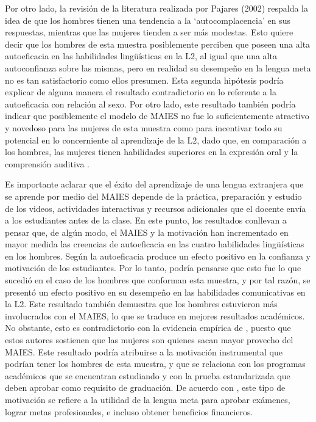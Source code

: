 \documentclass[spanish]{textolivre}
\begin{document}
Por otro lado, la revisión de la literatura realizada por Pajares (2002) respalda la idea de que los hombres tienen una tendencia a la ‘autocomplacencia’ en sus respuestas, mientras que las mujeres tienden a ser más modestas. Esto quiere decir que los hombres de esta muestra posiblemente perciben que poseen una alta autoeficacia en las habilidades lingüísticas en la L2, al igual que una alta autoconfianza sobre las mismas, pero en realidad su desempeño en la lengua meta no es tan satisfactorio como ellos presumen. Esta segunda hipótesis podría explicar de alguna manera el resultado contradictorio en lo referente a la autoeficacia con relación al sexo. Por otro lado, este resultado también podría indicar que posiblemente el modelo de MAIES no fue lo suficientemente atractivo y novedoso para las mujeres de esta muestra como para incentivar todo su potencial en lo concerniente al aprendizaje de la L2, dado que, en comparación a los hombres, las mujeres tienen habilidades superiores en la expresión oral y la comprensión auditiva \cite{abdelhafez_efl_2016,zhu_relationship_2020}.

Es importante aclarar que el éxito del aprendizaje de una lengua extranjera que se aprende por medio del MAIES depende de la práctica, preparación y estudio de los videos, actividades interactivas y recursos adicionales que el docente envía a los estudiantes antes de la clase. En este punto, los resultados conllevan a pensar que, de algún modo, el MAIES y la motivación han incrementado en mayor medida las creencias de autoeficacia en las cuatro habilidades lingüísticas en los hombres. Según \textcite{namaziandost_account_2020} la autoeficacia produce un efecto positivo en la confianza y motivación de los estudiantes. Por lo tanto, podría pensarse que esto fue lo que sucedió en el caso de los hombres que conforman esta muestra, y por tal razón, se presentó un efecto positivo en su desempeño en las habilidades comunicativas en la L2. Este resultado también demuestra que los hombres estuvieron más involucrados con el MAIES, lo que se traduce en mejores resultados académicos. No obstante, esto es contradictorio con la evidencia empírica de \textcite{chiquito_flipped_2020,namaziandost_account_2020}, puesto que estos autores sostienen que las mujeres son quienes sacan mayor provecho del MAIES. Este resultado podría atribuirse a la motivación instrumental que podrían tener los hombres de esta muestra, y que se relaciona con los programas académicos que se encuentran estudiando y con la prueba estandarizada que deben aprobar como requisito de graduación. De acuerdo con \textcite{alico_writing_2016}, este tipo de motivación se refiere a la utilidad de la lengua meta para aprobar exámenes, lograr metas profesionales, e incluso obtener beneficios financieros. 
\end{document}
